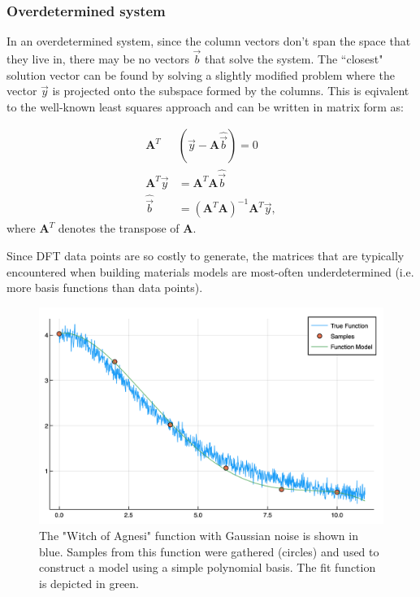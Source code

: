 \subsubsection{Overdetermined system}
In an overdetermined system, since the column vectors don't span the space that they live in, there may be no vectors $\vec{b}$ that solve the system.  The ``closest" solution vector can be found by solving a slightly modified problem where the vector $\vec{y}$ is projected onto the subspace formed by the columns.  This is eqivalent to the well-known least squares approach and can be written in matrix form as:

\begin{align}
\mathbf{A}^T&(\vec{y} - \mathbf{A} \hat{\vec{b}}) = 0 \\
\mathbf{A}^T\vec{y} &= \mathbf{A}^T\mathbf{A}\hat{\vec{b}} \\
\hat{\vec{b}} &= (\mathbf{A}^T\mathbf{A})^{-1}\mathbf{A}^T\vec{y}, \label{eq:bSolve}
\end{align}
where $\mathbf{A}^T$ denotes the transpose of $\mathbf{A}$.

\par Since DFT data points are so costly to generate, the matrices that are typically encountered when building materials models are most-often underdetermined (i.e. more basis functions than data points).


\begin{figure}[h]
\includegraphics[scale = 0.4]{Figures/func1True}
\caption{The "Witch of Agnesi" function with Gaussian noise is shown in blue.  Samples from this function were gathered (circles) and used to construct a model using a simple polynomial basis.  The fit function is depicted in green.
\label{fig:func1True}} 
\end{figure}



